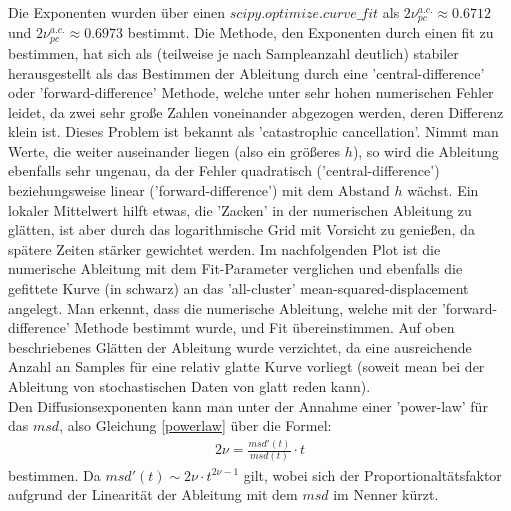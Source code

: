 \documentclass[a4paper, 12pt]{report}
\begin{document}
\noindent Die Exponenten wurden über einen $scipy.optimize.curve\_fit$ als $2\nu_{pc}^{a.c.} \approx 0.6712$ und $2\nu_{pc}^{a.c.} \approx0.6973$ bestimmt. Die Methode, den Exponenten durch einen fit zu bestimmen, hat sich als (teilweise je nach Sampleanzahl deutlich) stabiler herausgestellt als das Bestimmen der Ableitung durch eine 'central-difference' oder 'forward-difference' Methode, welche unter sehr hohen numerischen Fehler leidet, da zwei sehr große Zahlen voneinander abgezogen werden, deren Differenz klein ist. Dieses Problem ist bekannt als 'catastrophic cancellation'. Nimmt man Werte, die weiter auseinander liegen (also ein größeres $h$), so wird die Ableitung ebenfalls sehr ungenau, da der Fehler quadratisch ('central-difference') beziehungsweise linear ('forward-difference') mit dem Abstand $h$ wächst. Ein lokaler Mittelwert hilft etwas,
die 'Zacken' in der numerischen Ableitung zu glätten, ist aber durch das logarithmische Grid mit Vorsicht zu genießen, da spätere Zeiten stärker gewichtet werden. Im nachfolgenden Plot ist die numerische Ableitung mit dem Fit-Parameter verglichen und ebenfalls die gefittete Kurve (in schwarz) an das 'all-cluster' mean-squared-displacement angelegt. Man erkennt, dass die numerische Ableitung, welche mit der 'forward-difference' Methode bestimmt wurde, und Fit übereinstimmen. Auf oben beschriebenes Glätten der Ableitung wurde verzichtet, da eine ausreichende Anzahl an Samples für eine relativ glatte Kurve vorliegt (soweit mean bei der Ableitung von stochastischen Daten von glatt reden kann). 
\\
\noindent Den Diffusionsexponenten kann man unter der Annahme einer 'power-law' für das $msd$, also Gleichung \ref{powerlaw} über die Formel:
\begin{align}\label{diffusionexponent}
	2\nu = \frac{msd'(t)}{msd(t)} \cdot t
\end{align}
bestimmen. Da $msd'(t) \sim 2\nu \cdot t^{2\nu -1}$ gilt, wobei sich der Proportionaltätsfaktor aufgrund der Linearität der Ableitung mit dem $msd$ im Nenner kürzt.
\end{document}
